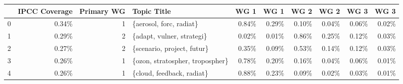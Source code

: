 \begin{tabular}{lrrlrrrrrr}
\toprule
{} &  IPCC Coverage &  Primary WG &                      Topic Title &  WG 1 &  WG 1 &  WG 2 &  WG 2 &  WG 3 &  WG 3 \\
\midrule
0 &          0.34\% &           1 &          \{aerosol, forc, radiat\} & 0.84\% & 0.29\% & 0.10\% & 0.04\% & 0.06\% & 0.02\% \\
1 &          0.29\% &           2 &        \{adapt, vulner, strategi\} & 0.02\% & 0.01\% & 0.86\% & 0.25\% & 0.12\% & 0.03\% \\
2 &          0.27\% &           2 &       \{scenario, project, futur\} & 0.35\% & 0.09\% & 0.53\% & 0.14\% & 0.12\% & 0.03\% \\
3 &          0.26\% &           1 &  \{ozon, stratospher, tropospher\} & 0.78\% & 0.20\% & 0.16\% & 0.04\% & 0.06\% & 0.01\% \\
4 &          0.26\% &           1 &        \{cloud, feedback, radiat\} & 0.88\% & 0.23\% & 0.09\% & 0.02\% & 0.03\% & 0.01\% \\
\bottomrule
\end{tabular}
